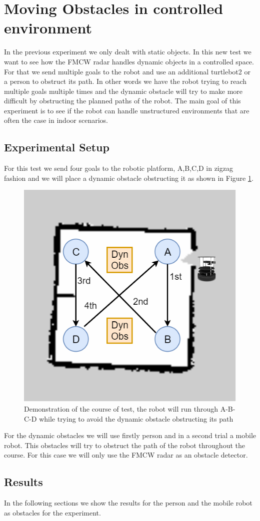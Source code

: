 \section{Moving Obstacles in controlled environment}
In the previous experiment we only dealt with static objects. In this new test we want to see how the \ac{FMCW} \ac{radar} handles dynamic objects in a controlled space. For that we send multiple goals  to the robot and use an additional turtlebot2 or a person to obstruct its path. In other words we have the robot trying to reach multiple goals multiple times and the dynamic obstacle will try to make more difficult by obstructing the planned paths of the robot.  The main goal of this experiment is to see if the robot can handle unstructured environments that are often the case in indoor scenarios.
\subsection{Experimental Setup}
For this test we send four goals to the robotic platform, A,B,C,D in zigzag fashion and we will place a dynamic obstacle obstructing it as shown in Figure \ref{fig:exp3}.

\begin{figure}[ht!]
\centerline{\includegraphics [width=0.5 \textwidth]{imgs/chapter5/exp4.png}}
\caption[Demonstration of the course of test]{Demonstration of the course of test, the robot will run through A-B-C-D  while  trying to avoid the dynamic obstacle obstructing its path}
\label{fig:exp3}
\end{figure}
For the dynamic obstacles we will use firstly person and in a second trial a mobile robot. This obstacles will try to obstruct the path of the robot throughout the course. For this case we will only use the \ac{FMCW} \ac{radar} as an obstacle detector.


\subsection{Results}
In the following sections we show the results for the person and the mobile robot as obstacles for the experiment.
